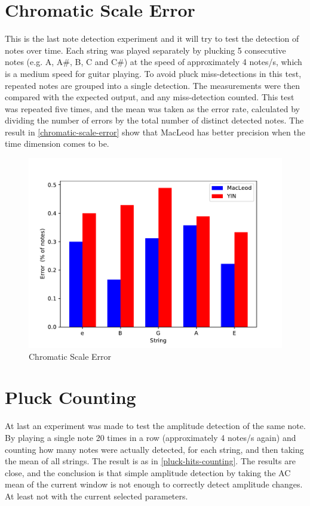 \section{Chromatic Scale Error}
This is the last note detection experiment and it will try to test the detection
of notes over time. Each string was played separately by plucking 5 consecutive
notes (e.g. A, A\#, B, C and C\#) at the speed of approximately 4 notes/s, which
is a medium speed for guitar playing. To avoid pluck miss-detections in this test, repeated notes
are grouped into a single detection. The measurements were then compared with the
expected output, and any miss-detection counted. This test was repeated five times,
and the mean was taken as the error rate, calculated by dividing the number of 
errors by the total number of distinct detected notes. The result in \autoref{chromatic-scale-error}
show that MacLeod has better precision when the time dimension comes to be.

\begin{figure}[!htpb]
  \centering
  \caption{Chromatic Scale Error}
  \label{chromatic-scale-error}
  \includegraphics[scale=0.85]{images/measurements/chromatic-scale-error}
\end{figure}

\section{Pluck Counting}
At last an experiment was made to test the amplitude detection of the same note.
By playing a single note 20 times in a row (approximately 4 notes/s again) and counting
how many notes were actually detected, for each string, and then taking the mean of all strings.
The result is as in \autoref{pluck-hits-counting}. The results are close, and the conclusion
is that simple amplitude detection by taking the AC mean of the current window is not enough
to correctly detect amplitude changes. At least not with the current selected parameters.

